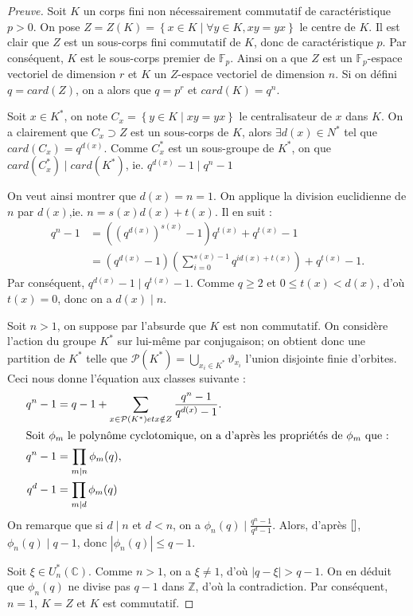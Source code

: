 \begin{proof}[Preuve]
	Soit $K$ un corps fini non nécessairement commutatif de caractéristique $p>0$.
\newline
	On pose $Z=Z(K)=\left\{x\in K\mid\forall y\in K,xy=yx\right\}$ le centre de $K$.
	Il est clair que $Z$ est un sous-corps fini commutatif de $K$, donc de caractéristique $p$. 
	Par conséquent, $K$ est le sous-corps premier de $\mathbb{F}_{p}$.
	Ainsi on a que $Z$ est un $\mathbb{F}_{p}$-espace vectoriel de dimension $r$ et $K$ un $Z$-espace vectoriel de dimension $n$.
	Si on défini $q=card(Z)$, on a alors que $q=p^{r}$ et $card(K)=q^{n}$.

	Soit $x\in K^{*}$, on note $C_{x}=\left\{y\in K\mid xy=yx\right\}$ le centralisateur de $x$ dans $K$.
	On a clairement que $C_{x}\supset Z$ est un sous-corps de $K$, alors $\exists d(x)\in N^{*}$ tel que $card(C_{x})=q^{d(x)}$.
	Comme $C^{*}_{x}$ est un sous-groupe de $K^{*}$, on que $card(C^{*}_{x})\mid card(K^{*})$, ie. $q^{d(x)}-1\mid q^{n}-1$ 

	On veut ainsi montrer que $d(x)=n=1$.
	On applique la division euclidienne de $n$ par $d(x)$,ie. $n=s(x)d(x)+t(x)$. Il en suit : 
	\begin{align*}
	q^{n}-1 &= \left((q^{d(x)})^{s(x)}-1\right)q^{t(x)}+q^{t(x)}-1\\
					&= (q^{d(x)}-1)\left(\sum^{s(x)-1}_{i=0}q^{id(x)+t(x)}\right)+q^{t(x)}-1.
	\end{align*}
	Par conséquent, $q^{d(x)}-1\mid q^{t(x)}-1$. Comme $q\geq 2$ et $0\leq t(x)<d(x)$, d'où $t(x)=0$, donc on a $d(x)\mid n$.

	Soit $n>1$, on suppose par l'absurde que $K$ est non commutatif.
	On considère l'action du groupe $K^{*}$ sur lui-même par conjugaison; on obtient donc une partition de $K^{*}$ telle que $\mathcal{P}(K^{*})=\bigcup_{x_{i}\in K^{*}}\vartheta_{x_{i}}$ l'union disjointe finie d'orbites.
	Ceci nous donne l'équation aux classes suivante : 
	\begin{align}
	q^{n}-1 &= q-1+\sum_{x\in\mathcal{P}(K^{*}) et x\notin Z}\frac{q^{n}-1}{q^{d(x)}-1}.\\
	\intertext{Soit $\phi_{m}$ le polynôme cyclotomique, on a d'après les propriétés de $\phi_{m}$ que :}
	q^{n}-1 &= \prod_{m\mid n}\phi_{m}(q),\\
	q^{d}-1 &= \prod_{m\mid d}\phi_{m}(q)
	\end{align}
	On remarque que si $d\mid n$ et $d<n$, on a $\phi_{n}(q)\mid\frac{q^{n}-1 }{q^{d}-1}$.
	Alors, d'après $\eqref{}$, $\phi_{n}(q)\mid q-1$, donc $\left|\phi_{n}(q)\right|\leq q-1$.

	Soit $\xi\in U^{*}_{n}{(\mathbb{C})}$. Comme $n>1$, on a $\xi\neq 1$, d'où $\left|q-\xi\right|>q-1$.
	On en déduit que $\phi_{n}(q)$ ne divise pas $q-1$ dans $\mathbb{Z}$, d'où la contradiction.
	Par conséquent, $n=1$, $K=Z$ et $K$ est commutatif.
\end{proof}

